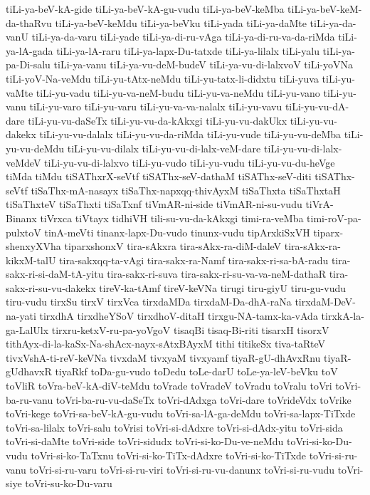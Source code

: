 {tiLi-ya-beV-kA-gide
tiLi-ya-beV-kA-gu-vudu
tiLi-ya-beV-keMba
tiLi-ya-beV-keM-da-thaRvu
tiLi-ya-beV-keMdu
tiLi-ya-beVku
tiLi-yada
tiLi-ya-daMte
tiLi-ya-da-vanU
tiLi-ya-da-varu
tiLi-yade
tiLi-ya-di-ru-vAga
tiLi-ya-di-ru-va-da-riMda
tiLi-ya-lA-gada
tiLi-ya-lA-raru
tiLi-ya-lapx-Du-tatxde
tiLi-ya-lilalx
tiLi-yalu
tiLi-ya-pa-Di-salu
tiLi-ya-vanu
tiLi-ya-vu-deM-budeV
tiLi-ya-vu-di-lalxvoV
tiLi-yoVNa
tiLi-yoV-Na-veMdu
tiLi-yu-tAtx-neMdu
tiLi-yu-tatx-li-didxtu
tiLi-yuva
tiLi-yu-vaMte
tiLi-yu-vadu
tiLi-yu-va-neM-budu
tiLi-yu-va-neMdu
tiLi-yu-vano
tiLi-yu-vanu
tiLi-yu-varo
tiLi-yu-varu
tiLi-yu-va-va-nalalx
tiLi-yu-vavu
tiLi-yu-vu-dA-dare
tiLi-yu-vu-daSeTx
tiLi-yu-vu-da-kAkxgi
tiLi-yu-vu-dakUkx
tiLi-yu-vu-dakekx
tiLi-yu-vu-dalalx
tiLi-yu-vu-da-riMda
tiLi-yu-vude
tiLi-yu-vu-deMba
tiLi-yu-vu-deMdu
tiLi-yu-vu-dilalx
tiLi-yu-vu-di-lalx-veM-dare
tiLi-yu-vu-di-lalx-veMdeV
tiLi-yu-vu-di-lalxvo
tiLi-yu-vudo
tiLi-yu-vudu
tiLi-yu-vu-du-heVge
tiMda
tiMdu
tiSAThxrX-seVtf
tiSAThx-seV-dathaM
tiSAThx-seV-diti
tiSAThx-seVtf
tiSaThx-mA-nasayx
tiSaThx-napxqq-thivAyxM
tiSaThxta
tiSaThxtaH
tiSaThxteV
tiSaThxti
tiSaTxnf
tiVmAR-ni-side
tiVmAR-ni-su-vudu
tiVrA-Binanx
tiVrxca
tiVtayx
tidhiVH
tili-su-vu-da-kAkxgi
timi-ra-veMba
timi-roV-pa-pulxtoV
tinA-meVti
tinanx-lapx-Du-vudo
tinunx-vudu
tipArxkiSxVH
tiparx-shenxyXVha
tiparxshonxV
tira-sAkxra
tira-sAkx-ra-diM-daleV
tira-sAkx-ra-kikxM-talU
tira-sakxqq-ta-vAgi
tira-sakx-ra-Namf
tira-sakx-ri-sa-bA-radu
tira-sakx-ri-si-daM-tA-yitu
tira-sakx-ri-suva
tira-sakx-ri-su-va-va-neM-dathaR
tira-sakx-ri-su-vu-dakekx
tireV-ka-tAmf
tireV-keVNa
tirugi
tiru-giyU
tiru-gu-vudu
tiru-vudu
tirxSu
tirxV
tirxVca
tirxdaMDa
tirxdaM-Da-dhA-raNa
tirxdaM-DeV-na-yati
tirxdhA
tirxdheYSoV
tirxdhoV-ditaH
tirxgu-NA-tamx-ka-vAda
tirxkA-la-ga-LalUlx
tirxru-ketxV-ru-pa-yoVgoV
tisaqBi
tisaq-Bi-riti
tisarxH
tisorxV
tithAyx-di-la-kaSx-Na-shAcx-nayx-sAtxBAyxM
tithi
titikeSx
tiva-taRteV
tivxVshA-ti-reV-keVNa
tivxdaM
tivxyaM
tivxyamf
tiyaR-gU-dhAvxRnu
tiyaR-gUdhavxR
tiyaRkf
toDa-gu-vudo
toDedu
toLe-darU
toLe-ya-leV-beVku
toV
toVliR
toVra-beV-kA-diV-teMdu
toVrade
toVradeV
toVradu
toVralu
toVri
toVri-ba-ru-vanu
toVri-ba-ru-vu-daSeTx
toVri-dAdxga
toVri-dare
toVrideVdx
toVrike
toVri-kege
toVri-sa-beV-kA-gu-vudu
toVri-sa-lA-ga-deMdu
toVri-sa-lapx-TiTxde
toVri-sa-lilalx
toVri-salu
toVrisi
toVri-si-dAdxre
toVri-si-dAdx-yitu
toVri-sida
toVri-si-daMte
toVri-side
toVri-sidudx
toVri-si-ko-Du-ve-neMdu
toVri-si-ko-Du-vudu
toVri-si-ko-TaTxnu
toVri-si-ko-TiTx-dAdxre
toVri-si-ko-TiTxde
toVri-si-ru-vanu
toVri-si-ru-varu
toVri-si-ru-viri
toVri-si-ru-vu-danunx
toVri-si-ru-vudu
toVri-siye
toVri-su-ko-Du-varu
}
